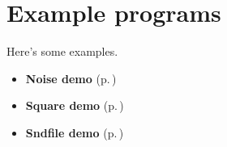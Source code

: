 \section{Example programs}
\label{group__examples}
Here's some examples.\begin{itemize}
\item {\bf Noise demo }{\rm (p.\,\pageref{group__noisedemo})}\item {\bf Square demo }{\rm (p.\,\pageref{group__squaredemo})}\item {\bf Sndfile demo }{\rm (p.\,\pageref{group__sndfiledemo})} \end{itemize}


